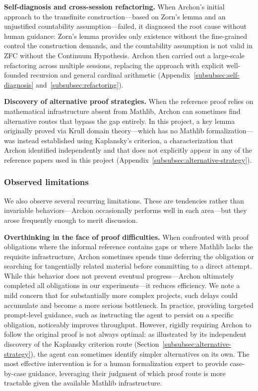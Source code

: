\documentclass[]{pkuai4m}
\theoremstyle{plain}
\theoremstyle{definition}
\begin{document}
\textbf{Self-diagnosis and cross-session refactoring.} When Archon's initial approach to the transfinite construction---based on Zorn's lemma and an unjustified countability assumption---failed, it diagnosed the root cause without human guidance: Zorn's lemma provides only existence without the fine-grained control the construction demands, and the countability assumption is not valid in ZFC without the Continuum Hypothesis. Archon then carried out a large-scale refactoring across multiple sessions, replacing the approach with explicit well-founded recursion and general cardinal arithmetic (Appendix~\ref{subsubsec:self-diagnosis} and~\ref{subsubsec:refactoring}).

\textbf{Discovery of alternative proof strategies.} When the reference proof relies on mathematical infrastructure absent from Mathlib, Archon can sometimes find alternative routes that bypass the gap entirely. In this project, a key lemma originally proved via Krull domain theory---which has no Mathlib formalization---was instead established using Kaplansky's criterion, a characterization that Archon identified independently and that does not explicitly appear in any of the reference papers used in this project (Appendix~\ref{subsubsec:alternative-strategy}).

\subsubsection{Observed limitations}

We also observe several recurring limitations. These are tendencies rather than invariable behaviors---Archon occasionally performs well in each area---but they arose frequently enough to merit discussion.

\textbf{Overthinking in the face of proof difficulties.} When confronted with proof obligations where the informal reference contains gaps or where Mathlib lacks the requisite infrastructure, Archon sometimes spends time deferring the obligation or searching for tangentially related material before committing to a direct attempt. While this behavior does not prevent eventual progress---Archon ultimately completed all obligations in our experiments---it reduces efficiency. We note a mild concern that for substantially more complex projects, such delays could accumulate and become a more serious bottleneck. In practice, providing targeted prompt-level guidance, such as instructing the agent to persist on a specific obligation, noticeably improves throughput. However, rigidly requiring Archon to follow the original proof is not always optimal: as illustrated by its independent discovery of the Kaplansky criterion route (Section~\ref{subsubsec:alternative-strategy}), the agent can sometimes identify simpler alternatives on its own. The most effective intervention is for a human formalization expert to provide case-by-case guidance, leveraging their judgment of which proof route is more tractable given the available Mathlib infrastructure.
\end{document}
